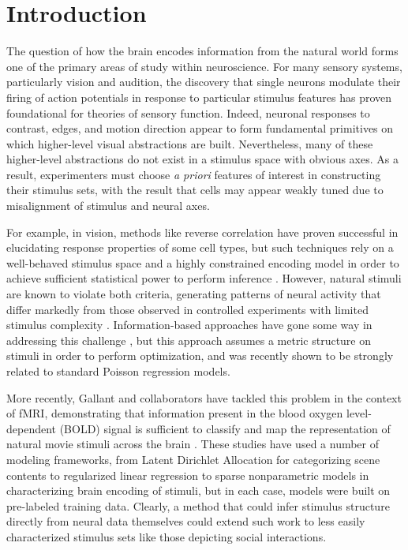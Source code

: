 \documentclass[10pt,letterpaper]{article}
\begin{document}
\linenumbers

\section*{Introduction}
The question of how the brain encodes information from the natural world forms one of the primary areas of study within neuroscience. For many sensory systems, particularly vision and audition, the discovery that single neurons modulate their firing of action potentials in response to particular stimulus features has proven foundational for theories of sensory function. Indeed, neuronal responses to contrast, edges, and motion direction appear to form fundamental primitives on which higher-level visual abstractions are built. Nevertheless, many of these higher-level abstractions do not exist in a stimulus space with obvious axes. As a result, experimenters must choose \emph{a priori} features of interest in constructing their stimulus sets, with the result that cells may appear weakly tuned due to misalignment of stimulus and neural axes.

For example, in vision, methods like reverse correlation have proven successful in elucidating response properties of some cell types, but such techniques rely on a well-behaved stimulus space and a highly constrained encoding model in order to achieve sufficient statistical power to perform inference \cite{steveninck1988realtime,ringach2004reverse,ringach2002receptive}. However, natural stimuli are known to violate both criteria, generating patterns of neural activity that differ markedly from those observed in controlled experiments with limited stimulus complexity \cite{ringach2002receptive,sharpee2004analyzing,Vinje2000-dx}. Information-based approaches have gone some way in addressing this challenge \cite{sharpee2004analyzing}, but this approach assumes a metric structure on stimuli in order to perform optimization, and was recently shown to be strongly related to standard Poisson regression models\cite{Williamson2013-rg}.

More recently, Gallant and collaborators have tackled this problem in the context of fMRI, demonstrating that information present in the blood oxygen level-dependent (BOLD) signal is sufficient to classify and map the representation of natural movie stimuli across the brain \cite{Vu2011-da,Huth2012-cj,Stansbury2013-nm}. These studies have used a number of modeling frameworks, from Latent Dirichlet Allocation for categorizing scene contents \cite{Stansbury2013-nm} to regularized linear regression \cite{Huth2012-cj} to sparse nonparametric models \cite{Vu2011-da} in characterizing brain encoding of stimuli, but in each case, models were built on pre-labeled training data. Clearly, a method that could infer stimulus structure directly from neural data themselves could extend such work to less easily characterized stimulus sets like those depicting social interactions.
\end{document}
